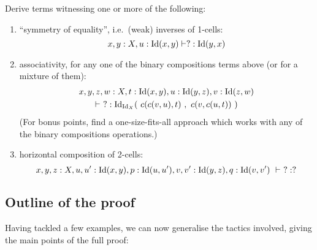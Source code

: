 \begin{exercise}Derive terms witnessing one or more of the following:
\begin{enumerate}
\item ``symmetry of equality'', i.e.\ (weak) inverses of 1-cells:
$$x,y:X, u:\mathrm{Id}(x,y) \vdash ? : \mathrm{Id}(y,x)$$

\item \label{ex:assoc}associativity, for any one of the binary compositions terms above (or for a mixture of them):
\begin{multline*}x,y,z,w:X, t:\mathrm{Id}(x,y), u:\mathrm{Id}(y,z), v:\mathrm{Id}(z,w) \\ 
\vdash\ ? : \mathrm{Id}_{\mathrm{Id}_X} (\ c(c(v,u),t)\ ,\ c(v,c(u,t))\ )
\end{multline*}
(For bonus points, find a one-size-fits-all approach which works with any of the binary compositions operations.)

\item horizontal composition of 2-cells:
$$ x,y,z:X, u,u':\mathrm{Id}(x,y), p:\mathrm{Id}(u,u'), v,v':\mathrm{Id}(y,z), q:\mathrm{Id}(v,v')\ \vdash\ ? : ? $$
\end{enumerate}
\end{exercise}

\subsection*{Outline of the proof}
Having tackled a few examples, we can now generalise the tactics involved, giving the main points of the full proof:

